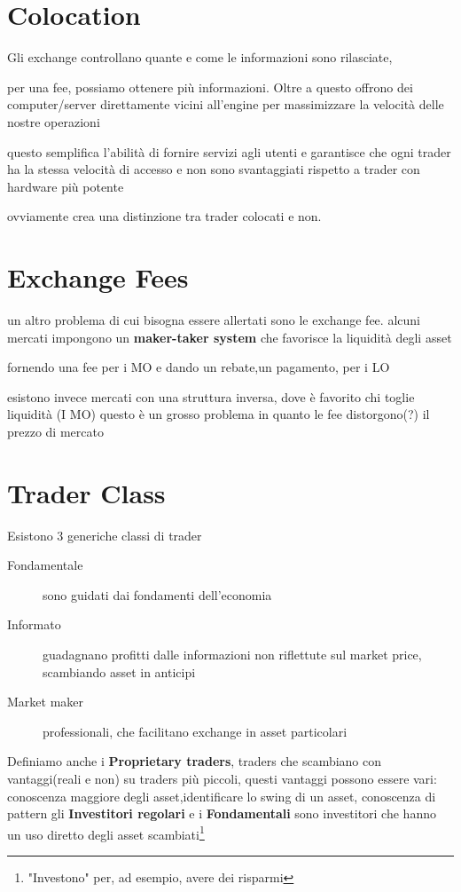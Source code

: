 \documentclass[a4paper,11pt]{report}
\begin{document}
{\newpage

\section{Colocation}
	Gli exchange controllano quante e come le informazioni sono rilasciate,

	per una fee, possiamo ottenere più informazioni. \newline
	Oltre a questo offrono dei computer/server direttamente vicini all'engine per massimizzare la velocità delle nostre operazioni

	questo semplifica l'abilità di fornire servizi agli utenti e garantisce che ogni trader ha la stessa velocità di accesso e non sono svantaggiati rispetto a trader con hardware più potente

	ovviamente crea una distinzione tra trader colocati e non.
\section{Exchange Fees}
	un altro problema di cui bisogna essere allertati sono le exchange fee. \newline
	alcuni mercati impongono un \textbf{maker-taker system} che favorisce la liquidità degli asset

	fornendo una fee per i MO e dando un rebate,un pagamento, per i LO

	esistono invece mercati con una struttura inversa, dove è favorito chi toglie liquidità (I MO) \newline
	 questo è un grosso problema in quanto le fee distorgono(?) il prezzo di mercato
\section{Trader Class}
	Esistono 3 generiche classi di trader
\begin{description}
	\item[Fondamentale] sono guidati dai fondamenti dell'economia
	\item[Informato] guadagnano profitti dalle informazioni non riflettute sul market price, scambiando asset in anticipi
	\item[Market maker] professionali, che facilitano exchange in asset particolari
\end{description}
	Definiamo anche i \textbf{Proprietary traders}, traders che scambiano con vantaggi(reali e non) su traders più piccoli, questi 		vantaggi possono essere vari: conoscenza maggiore degli asset,identificare lo swing di un asset, conoscenza di pattern \newline
	gli \textbf{Investitori regolari} e i \textbf{Fondamentali} sono investitori che hanno un uso diretto degli asset scambiati\footnote{ "Investono" per, ad esempio, avere dei risparmi}

}
\end{document}
